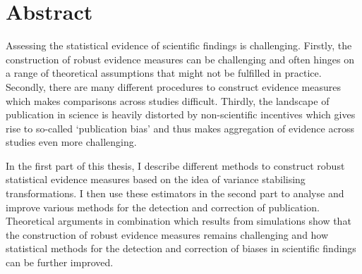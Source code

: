 

\chapter*{Abstract}
\label{cha:abstract}

Assessing the statistical evidence of scientific findings is challenging. Firstly, the construction of robust evidence measures can  be challenging and often hinges on a range of theoretical assumptions that might not be fulfilled in practice. Secondly, there are many different procedures to construct evidence measures which makes comparisons across studies difficult. Thirdly, the landscape of publication in science is heavily distorted by non-scientific incentives which gives rise to so-called `publication bias' and thus makes aggregation of evidence across studies even more challenging.\par 
In the first part of this thesis, I describe different methods to construct robust statistical evidence measures based on the idea of variance stabilising transformations. I then use these estimators in the second part to analyse and improve various methods for the detection and correction of publication. Theoretical arguments in combination which results from simulations show that the construction of robust evidence measures remains challenging and how statistical methods for the detection and correction of biases in scientific findings can be further improved.

